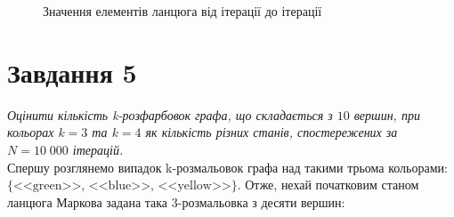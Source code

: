 \documentclass[a4paper,14pt]{extarticle} %
\numberwithin{equation}{section}
\begin{document}
\begin{figure}[H]
    \caption{Значення елементів ланцюга від ітерації до ітерації}
    \label{figure: task 4.2}
\end{figure}

\newpage
\section*{Завдання 5}

\textit{Оцінити кількість k-розфарбовок графа, що складається з $10$ вершин, при кольорах $k=3$ та $k=4$ як кількість різних станів, спостережених за $N=10\;000$ ітерацій.} \\

Спершу розглянемо випадок k-розмальовок графа над такими трьома кольорами: $\{\text{<<green>>, <<blue>>, <<yellow>>}\}$. Отже, нехай початковим станом ланцюга Маркова задана така 3-розмальовка з десяти вершин:
\end{document}
